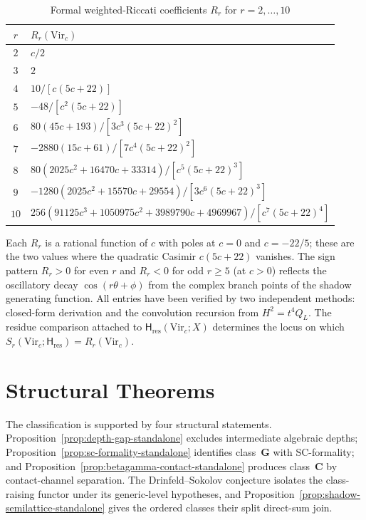 \documentclass[11pt]{article}
\theoremstyle{plain}
\theoremstyle{definition}
\theoremstyle{remark}
\providecommand{\Vir}{\mathrm{Vir}}
\begin{document}
\begin{table}[ht]
\centering
\caption{Formal weighted-Riccati coefficients $R_r$ for
$r = 2, \dotsc, 10$}
\label{tab:virasoro-tower}
\renewcommand{\arraystretch}{1.35}
{\small
\begin{tabular}{cl}
\toprule
$r$ & $R_r(\mathrm{Vir}_c)$ \\
\midrule
$2$ & $c/2$ \\
$3$ & $2$ \\
$4$ & $10/[c(5c+22)]$ \\
$5$ & $-48/[c^2(5c+22)]$ \\
$6$ & $80(45c+193)/[3c^3(5c+22)^2]$ \\
$7$ & $-2880(15c+61)/[7c^4(5c+22)^2]$ \\
$8$ & $80(2025c^2+16470c+33314)/[c^5(5c+22)^3]$ \\
$9$ & $-1280(2025c^2+15570c+29554)/[3c^6(5c+22)^3]$ \\
$10$ & $256(91125c^3+1050975c^2+3989790c+4969967)/[c^7(5c+22)^4]$ \\
\bottomrule
\end{tabular}
}
\end{table}

\noindent
Each $R_r$ is a rational function of $c$ with poles at $c = 0$ and
$c = -22/5$; these are the two values where the quadratic Casimir
$c(5c+22)$ vanishes. The sign pattern
$R_r > 0$ for even $r$ and $R_r < 0$ for odd $r \geq 5$
(at $c > 0$) reflects the oscillatory decay $\cos(r\theta + \phi)$
from the complex branch points of the shadow generating function.
All entries have been verified by two independent methods: closed-form
derivation and the convolution recursion from $H^2 = t^4 Q_L$.
The residue comparison attached to
$\mathsf H_{\mathrm{res}}(\Vir_c;X)$ determines the locus on which
$S_r(\Vir_c;\mathsf H_{\mathrm{res}})=R_r(\Vir_c)$.



\section{Structural Theorems}\label{sec:structural-theorems}

The classification is supported by four structural statements.
Proposition~\ref{prop:depth-gap-standalone} excludes intermediate
algebraic depths; Proposition~\ref{prop:sc-formality-standalone}
identifies class~$\mathbf{G}$ with SC-formality; and
Proposition~\ref{prop:betagamma-contact-standalone} produces
class~$\mathbf{C}$ by contact-channel separation. The
Drinfeld--Sokolov conjecture isolates the class-raising functor under
its generic-level hypotheses, and
Proposition~\ref{prop:shadow-semilattice-standalone}
gives the ordered classes their split direct-sum join.
\end{document}
